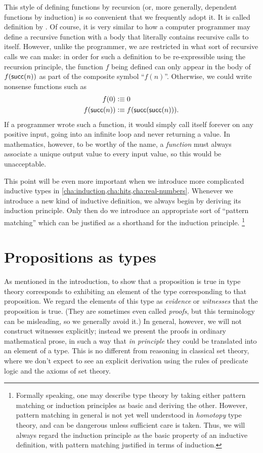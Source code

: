 This style of defining functions by recursion (or, more generally, dependent functions by induction) is so convenient that we frequently adopt it.
It is called definition by .
Of course, it is very similar to how a computer programmer may define a recursive function with a body that literally contains recursive calls to itself.
However, unlike the programmer, we are restricted in what sort of recursive calls we can make: in order for such a definition to be re-expressible using the recursion principle, the function $f$ being defined can only appear in the body of $f(\mathsf{succ}(n))$ as part of the composite symbol ``$f(n)$''.
Otherwise, we could write nonsense functions such as
\begin{align*}
  f(0)&\vcentcolon\equiv 0\\
  f(\mathsf{succ}(n)) &\vcentcolon\equiv f(\mathsf{succ}(\mathsf{succ}(n))).
\end{align*}
If a programmer wrote such a function, it would simply call itself forever on any positive input, going into an infinite loop and never returning a value.
In mathematics, however, to be worthy of the name, a \emph{function} must always associate a unique output value to every input value, so this would be unacceptable.

This point will be even more important when we introduce more complicated inductive types in \autoref{cha:induction,cha:hits,cha:real-numbers}.
Whenever we introduce a new kind of inductive definition, we always begin by deriving its induction principle.
Only then do we introduce an appropriate sort of ``pattern matching'' which can be justified as a shorthand for the induction principle.%
\footnote{Formally speaking, one may describe type theory by taking either pattern matching or induction principles as basic and deriving the other.
  However, pattern matching in general is not yet well understood in \emph{homotopy} type theory, and can be dangerous unless sufficient care is taken.
  Thus, we will always regard the induction principle as the basic property of an inductive definition, with pattern matching justified in terms of induction.}


\section{Propositions as types}
\label{sec:pat}

As mentioned in the introduction, to show that a proposition is true in type theory corresponds to exhibiting an element of the type corresponding to that proposition.
We regard the elements of this type as \emph{evidence} or \emph{witnesses} that the proposition is true. (They are sometimes even called \emph{proofs}, but this terminology can be misleading, so we generally avoid it.)
In general, however, we will not construct witnesses explicitly; instead we present the proofs in ordinary mathematical prose, in such a way that \emph{in principle} they could be translated into an element of a type.
This is no different from reasoning in classical set theory, where we don't expect to see an explicit derivation using the rules of predicate logic and the axioms of set theory.

